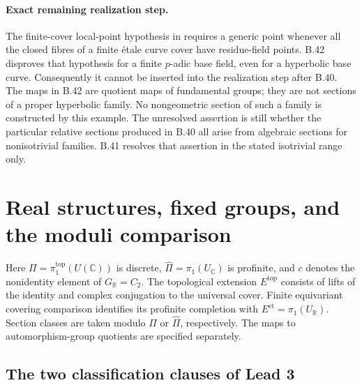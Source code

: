 \documentclass[11pt,oneside]{article}
\begin{document}
\paragraph{Exact remaining realization step.}
The finite-cover local-point hypothesis in
\cite[Definition 0.2(vi)]{B_SaidiFunctionFields}
requires a generic point whenever all the
closed fibres of a finite \'etale curve cover
have residue-field points. B.42 disproves
that hypothesis for a finite $p$-adic base
field, even for a hyperbolic base curve.
Consequently it cannot be inserted into
the realization step after B.40.
The maps in B.42 are quotient maps of
fundamental groups; they are not sections
of a proper hyperbolic family. No
nongeometric section of such a family is
constructed by this example.
The unresolved assertion is still whether
the particular relative sections produced
in B.40 all arise from algebraic sections
for nonisotrivial families. B.41 resolves
that assertion in the stated isotrivial
range only.

\section{Real structures, fixed groups, and the moduli comparison}
\label{sec:C}
Here $\Pi=\pi_1^{\mathrm{top}}(U(\mathbb C))$ is discrete,
$\widehat\Pi=\pi_1(U_{\mathbb C})$ is profinite, and
$c$ denotes the nonidentity element of $G_{\mathbb R}=C_2$.
The topological extension $E^{\mathrm{top}}$ consists of
lifts of the identity and complex conjugation to the universal
cover. Finite equivariant covering comparison identifies its
profinite completion with $E^{\mathrm{et}}=\pi_1(U_{\mathbb R})$.
Section classes are taken modulo $\Pi$ or $\widehat\Pi$,
respectively. The maps to automorphism-group quotients are
specified separately.

\subsection{The two classification clauses of Lead 3}
\end{document}
